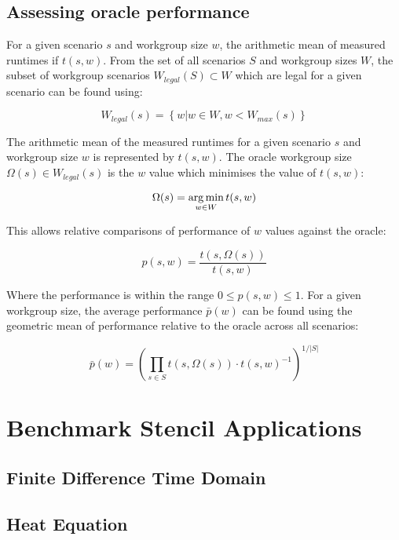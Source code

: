 \subsection{Assessing oracle performance}
For a given scenario $s$ and workgroup size $w$, the arithmetic mean
of measured runtimes if $t(s,w)$. From the set of all scenarios $S$
and workgroup sizes $W$, the subset of workgroup scenarios
$W_{legal}(S) \subset W$ which are legal for a given scenario can be
found using:

\begin{equation}
W_{legal}(s) = \left\{w | w \in W, w < W_{max}(s) \right\}
\end{equation}

The arithmetic mean of the measured runtimes for a given scenario $s$
and workgroup size $w$ is represented by $t(s,w)$. The oracle
workgroup size $\Omega(s) \in W_{legal}(s)$ is the $w$ value which
minimises the value of $t(s,w)$:

\begin{equation}
\Omega(s) = \operatorname*{arg\,min}_{w \in W} t(s,w)
\end{equation}

This allows relative comparisons of performance of $w$ values against
the oracle:

\begin{equation}
p(s,w) = \frac{t(s,\Omega(s))}{t(s,w)}
\end{equation}

Where the performance is within the range $0 \le p(s,w) \le 1$. For a
given workgroup size, the average performance $\bar{p}(w)$ can be
found using the geometric mean of performance relative to the oracle
across all scenarios:

\begin{equation}
\bar{p}(w) =
\left(
  \prod_{s \in S} t(s,\Omega(s)) \cdot t(s,w)^{-1}
\right)^{1/|S|}
\end{equation}


\section{Benchmark Stencil Applications}

\subsection{Finite Difference Time Domain}

\subsection{Heat Equation}

